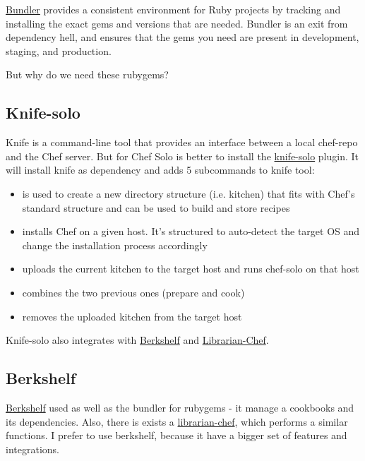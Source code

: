 \href{http://bundler.io/}{Bundler} provides a consistent environment for Ruby projects by tracking and installing the exact gems and versions that are needed. Bundler is an exit from dependency hell, and ensures that the gems you need are present in development, staging, and production.

But why do we need these rubygems?

\subsection{Knife-solo}

Knife is a command-line tool that provides an interface between a local chef-repo and the Chef server. But for Chef Solo is better to install the \href{http://matschaffer.github.io/knife-solo/}{knife-solo} plugin. It will install knife as dependency and adds 5 subcommands to knife tool:

\begin{itemize}
  \item {} is used to create a new directory structure (i.e. kitchen) that fits with Chef's standard structure and can be used to build and store recipes
  \item {} installs Chef on a given host. It's structured to auto-detect the target OS and change the installation process accordingly
  \item {} uploads the current kitchen to the target host and runs chef-solo on that host
  \item {} combines the two previous ones (prepare and cook)
  \item {} removes the uploaded kitchen from the target host
\end{itemize}

Knife-solo also integrates with \href{http://berkshelf.com/}{Berkshelf} and \href{https://github.com/applicationsonline/librarian-chef}{Librarian-Chef}.

\subsection{Berkshelf}

\href{http://berkshelf.com/}{Berkshelf} used as well as the bundler for rubygems - it manage a cookbooks and its dependencies. Also, there is exists a \href{https://github.com/applicationsonline/librarian-chef}{librarian-chef}, which performs a similar functions. I prefer to use berkshelf, because it have a bigger set of features and integrations.
